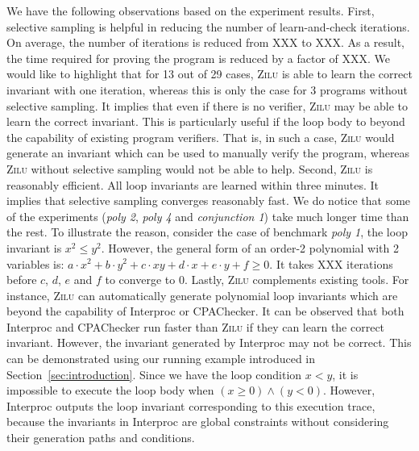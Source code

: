 We have the following observations based on the experiment results. First, selective sampling is helpful in reducing the number of learn-and-check iterations. On average, the number of iterations is reduced from XXX to XXX. As a result, the time required for proving the program is reduced by a factor of XXX. We would like to highlight that for 13 out of 29 cases, \textsc{Zilu} is able to learn the correct invariant with one iteration, whereas this is only the case for 3 programs without selective sampling. It implies that even if there is no verifier, \textsc{Zilu} may be able to learn the correct invariant. This is particularly useful if the loop body to beyond the capability of existing program verifiers. That is, in such a case, \textsc{Zilu} would generate an invariant which can be used to manually verify the program, whereas \textsc{Zilu} without selective sampling would not be able to help. Second, \textsc{Zilu} is reasonably efficient. All loop invariants are learned within three minutes. It implies that selective sampling converges reasonably fast. We do notice that some of the experiments (\emph{poly 2}, \emph{poly 4} and \emph{conjunction 1}) take much longer time than the rest. To illustrate the reason, consider the case of benchmark \emph{poly 1}, the loop invariant is $x^2 \le y^2$.
However, the general form of an order-2 polynomial with 2 variables
is: $a \cdot x^2 + b \cdot y^2 + c \cdot x y + d \cdot x + e \cdot y + f \geq 0$. It takes XXX iterations before $c$, $d$, $e$ and $f$ to converge to 0.
Lastly, \textsc{Zilu} complements existing tools. For instance, \textsc{Zilu} can automatically generate polynomial loop invariants
which are beyond the capability of Interproc or CPAChecker. It can be observed that both Interproc and CPAChecker run faster than \textsc{Zilu} if they can learn the correct invariant. However, the invariant generated by Interproc may not be correct. This can be demonstrated using our running example introduced in Section~\ref{sec:introduction}. Since we have the loop condition $x < y$, it is impossible to execute the loop body when $(x \ge 0) \land (y < 0)$. 
However, Interproc outputs the loop invariant corresponding to this execution trace,
because the invariants in Interproc are global constraints
without considering their generation paths and conditions.

